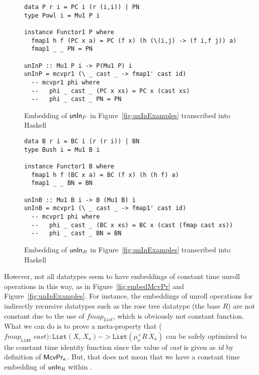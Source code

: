 \begin{figure}
\begin{singlespace}
\begin{lstlisting}
data P r i = PC i (r (i,i)) | PN
type Powl i = Mu1 P i

instance Functor1 P where
  fmap1 h f (PC x a) = PC (f x) (h (\(i,j) -> (f i,f j)) a)
  fmap1 _ _ PN = PN

unInP :: Mu1 P i -> P(Mu1 P) i
unInP = mcvpr1 (\ _ cast _ -> fmap1' cast id)
  -- mcvpr1 phi where
  --   phi _ cast _ (PC x xs) = PC x (cast xs)
  --   phi _ cast _ PN = PN
\end{lstlisting}
\end{singlespace}
\caption{Embedding of $\mathsf{unIn}_P$ in Figure~\ref{fig:unInExamples}
	transcribed into Haskell}
\label{fig:HaskellunInP}
\end{figure}


\begin{figure}
\begin{singlespace}
\begin{lstlisting}
data B r i = BC i (r (r i)) | BN
type Bush i = Mu1 B i

instance Functor1 B where
  fmap1 h f (BC x a) = BC (f x) (h (h f) a)
  fmap1 _ _ BN = BN

unInB :: Mu1 B i -> B (Mu1 B) i
unInB = mcvpr1 (\ _ cast _ -> fmap1' cast id)
  -- mcvpr1 phi where
  --   phi _ cast _ (BC x xs) = BC x (cast (fmap cast xs))
  --   phi _ cast _ BN = BN
\end{lstlisting}
\end{singlespace}
\caption{Embedding of $\mathsf{unIn}_B$ in Figure~\ref{fig:unInExamples}
	transcribed into Haskell}
\label{fig:HaskellunInB}
\end{figure}


However, not all datatypes seem to have embeddings of constant time 
unroll operations in this way, as in Figure~\ref{fig:embedMcvPr} and
Figure~\ref{fig:unInExamples}. For instance, the embeddings of
unroll operations for indirectly recursive datatypes such as
the rose tree datatype (the base $R$) are not constant due to the
use of $\textit{fmap}_\textit{List}$, which is obviously not constant
function. What we can do is to prove a meta-property that 
($\textit{fmap}_\texttt{List}\;\textit{cast}) : \texttt{List}(X_r\,X_a)
-> \texttt{List}(\mu^{+}_\kappa R\,X_a)$ can be safely optimized
to the constant time identity function since the value of \textit{cast}
is given as \textit{id} by definition of $\mathsf{McvPr}_\kappa$. But, that does
not mean that we have a constant time embedding of $\mathsf{unIn}_R$ within \Fixi.

